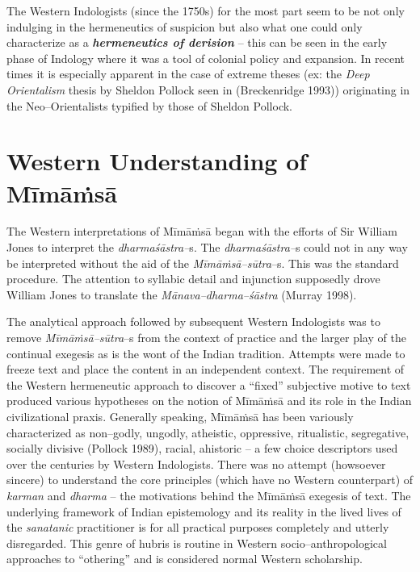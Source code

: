 The Western Indologists (since the 1750s) for the most part seem to be not only indulging in the hermeneutics of suspicion but also what one could only characterize as a \textbf{\textit{hermeneutics of derision}} – this can be seen in the early phase of Indology where it was a tool of colonial policy and expansion. In recent times it is especially apparent in the case of extreme theses (ex: the \textit{Deep Orientalism} thesis by Sheldon Pollock seen in (Breckenridge 1993)) originating in the Neo–Orientalists typified by those of Sheldon Pollock.


\section*{Western Understanding of Mīmāṁsā}

The Western interpretations of Mīmāṁsā began with the efforts of Sir William Jones to interpret the \textit{dharmaśāstra–}s. The \textit{dharmaśāstra–}s could not in any way be interpreted without the aid of the \textit{Mīmāṁsā–sūtra}–s. This was the standard procedure. The attention to syllabic detail and injunction supposedly drove William Jones to translate the \textit{Mānava–dharma–śāstra} (Murray 1998).

The analytical approach followed by subsequent Western Indologists was to remove \textit{Mīmāṁsā–sūtra}–s from the context of practice and the larger play of the continual exegesis as is the wont of the Indian tradition. Attempts were made to freeze text and place the content in an independent context. The requirement of the Western hermeneutic approach to discover a “fixed” subjective motive to text produced various hypotheses on the notion of Mīmāṁsā and its role in the Indian civilizational praxis. Generally speaking, Mīmāṁsā has been variously characterized as non–godly, ungodly, atheistic, oppressive, ritualistic, segregative, socially divisive (Pollock 1989), racial, ahistoric – a few choice descriptors used over the centuries by Western Indologists. There was no attempt (howsoever sincere) to understand the core principles (which have no Western counterpart) of \textit{karman} and \textit{dharma} – the motivations behind the Mīmāṁsā exegesis of text. The underlying framework of Indian epistemology and its reality in the lived lives of the \textit{sanatanic} practitioner is for all practical purposes completely and utterly disregarded. This genre of hubris is routine in Western socio–anthropological approaches to “othering” and is considered normal Western scholarship.

